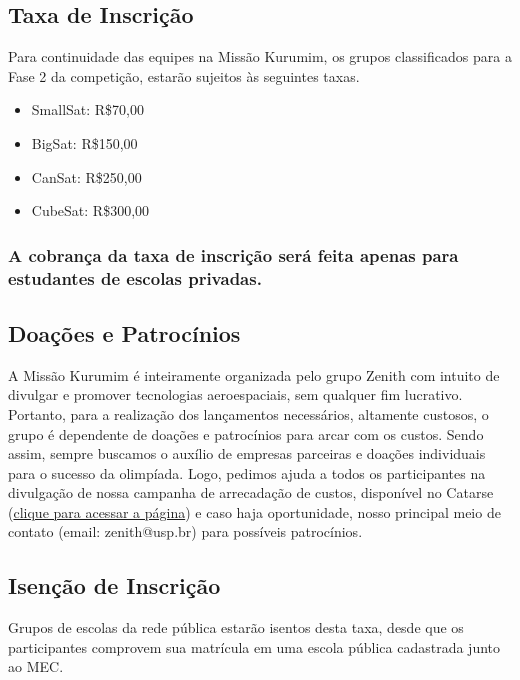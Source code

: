     \subsection{Taxa de Inscrição}\label{sec: taxa}

        \par Para continuidade das equipes na Missão Kurumim, os grupos classificados 
        para a Fase 2 da competição, estarão sujeitos às seguintes taxas.

        \begin{itemize}
            \item SmallSat: R\$70,00
            \item BigSat: R\$150,00
            \item CanSat: R\$250,00
            \item CubeSat: R\$300,00
        \end{itemize}

        \subsubsection*{A cobrança da taxa de inscrição será feita apenas para estudantes 
        de escolas privadas.}\label{sec:taxa_privada}

    \subsection{Doações e Patrocínios}\label{sec:doacoes}
        \par A Missão Kurumim é inteiramente organizada pelo grupo Zenith com intuito de 
        divulgar e promover tecnologias aeroespaciais, sem qualquer fim lucrativo. Portanto,
        para a realização dos lançamentos necessários, altamente custosos, o grupo é dependente
        de doações e patrocínios para arcar com os custos. Sendo assim, sempre buscamos o auxílio 
        de empresas parceiras e doações individuais para o sucesso da olimpíada. Logo, pedimos ajuda 
        a todos os participantes na divulgação de nossa campanha de arrecadação de custos, disponível 
        no Catarse (\href{https://www.catarse.me/missao_kurumim_2025?ref=project_link}{clique para acessar a página}) e caso haja oportunidade, nosso principal meio de contato (email: zenith@usp.br) para possíveis patrocínios.

    \subsection{Isenção de Inscrição}\label{sec:isencao}
        \par Grupos de escolas da rede pública estarão isentos desta taxa, desde que os participantes 
        comprovem sua matrícula em uma escola pública cadastrada junto ao MEC.


